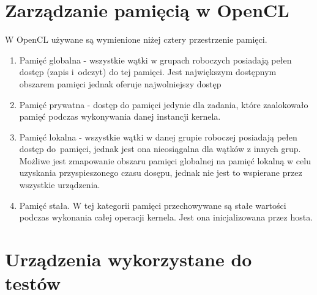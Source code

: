 \section{Zarządzanie pamięcią w OpenCL}
W OpenCL używane są wymienione niżej cztery przestrzenie pamięci.
\begin{enumerate}
  \item Pamięć globalna - wszystkie wątki w grupach roboczych posiadają pełen dostęp (zapis i~odczyt) do tej pamięci. Jest największym dostępnym obszarem pamięci jednak oferuje najwolniejszy dostęp
  \item Pamięć prywatna - dostęp do pamięci jedynie dla zadania, które zaalokowało pamięć podczas wykonywania danej instancji kernela.
  \item Pamięć lokalna - wszystkie wątki w danej grupie roboczej posiadają pełen dostęp do~pamięci, jednak jest ona nieosiągalna dla wątków z innych grup. Możliwe jest zmapowanie obszaru pamięci globalnej na pamięć lokalną w celu uzyskania przyspieszonego czasu dosępu, jednak nie jest to wspierane przez wszystkie urządzenia.
  \item Pamięć stała. W tej kategorii pamięci przechowywane są stałe wartości podczas wykonania całej operacji kernela. Jest ona inicjalizowana przez hosta.
\end{enumerate}

\section{Urządzenia wykorzystane do testów}
